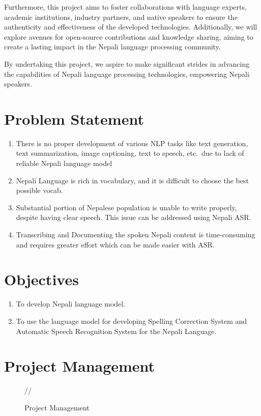 Furthermore, this project aims to foster collaborations with language experts, academic institutions, industry partners, and native speakers to ensure the authenticity and effectiveness of the developed technologies. Additionally, we will explore avenues for open-source contributions and knowledge sharing, aiming to create a lasting impact in the Nepali language processing community.

By undertaking this project, we aspire to make significant strides in advancing the capabilities of Nepali language processing technologies, empowering Nepali speakers.

\section{Problem Statement}
\begin{enumerate}
    
    \item There is no proper development of various NLP tasks like text generation, text summarization, image captioning, text to speech, etc.\ due to lack of reliable Nepali language model
    \item Nepali Language is rich in vocabulary, and it is difficult to choose the best possible vocab.
    \item Substantial portion of Nepalese population is unable to write properly, despite having clear speech. This issue can be addressed using Nepali ASR.
    \item Transcribing and Documenting the spoken Nepali content is time-consuming and requires greater effort which can be made easier with ASR.
\end{enumerate}

\section{Objectives}
\begin{enumerate}
    \item To develop Nepali language model.
    \item To use the language model for developing Spelling Correction System and Automatic Speech Recognition System for the Nepali Language.
\end{enumerate}

\section{Project Management}
\begin{figure}[H]
    \centering
    
    //
    \caption{Project Management}
    \label{fig:my_label}
\end{figure}

